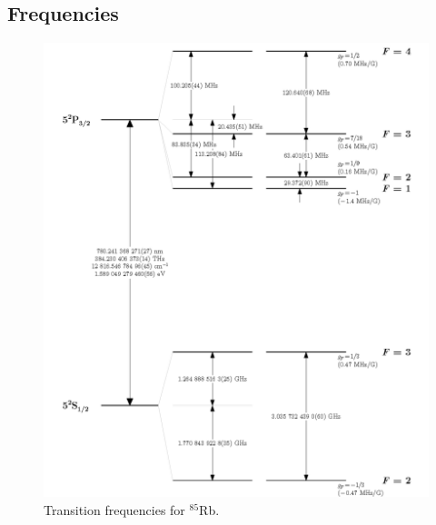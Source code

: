 \documentclass{article}
\begin{document}
\begin{appendices}

\section{Frequencies}
\label{app:frequencies}

\begin{figure}[h]
    \centering
    \includegraphics{Figures/4/rubidium85numbers.png}
    \caption{Transition frequencies for $^{85}$Rb. \cite{asteck_alkali}}
    \label{fig:transition_frequencies_Rb85}
\end{figure}

\pagebreak{}


\end{appendices}
\end{document}
